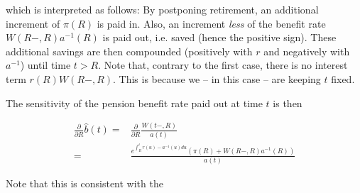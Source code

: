 \documentclass{book}
\newcommand{\1}[1]{\mathbbm{1}_{\left\lbrace #1 \right\rbrace}}
\theoremstyle{break}
\theoremstyle{remark}
\numberwithin{equation}{section}
\begin{document}
which is interpreted as follows: By postponing retirement, an additional increment of $\pi(R)$ is paid in. Also, an increment \textit{less} of the benefit rate $W(R-,R) a^{-1}(R)$ is paid out, i.e. saved (hence the positive sign). These additional savings are then compounded (positively with $r$ and negatively with $a^{-1}$) until time $t>R$. Note that, contrary to the first case, there is no interest term $r(R)W(R-,R)$. This is because we -- in this case -- are keeping $t$ fixed.

The sensitivity of the pension benefit rate paid out at time $t$ is then

\begin{align*}
	\frac{\partial}{\partial R} \hat{b}(t) =& \frac{\partial}{\partial R} \frac{W(t-,R)}{a(t)} \\ =& \frac{e^{\int_R^t r(u) - a^{-1}(u) du} \left( \pi (R) + W(R-,R) a^{-1}(R) \right)}{a(t)}
\end{align*}

Note that this is consistent with the 
\end{document}
